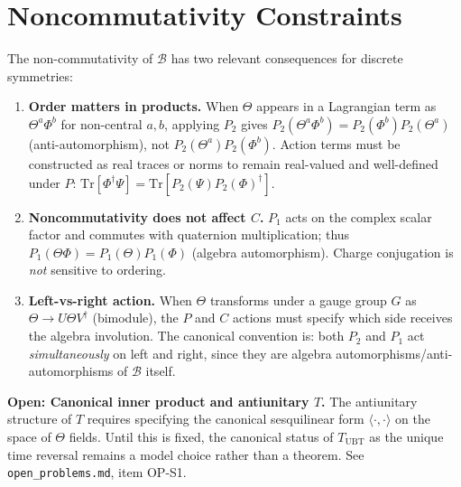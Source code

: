 \documentclass[12pt,a4paper]{article}
\theoremstyle{definition}
\theoremstyle{remark}
\begin{document}
\section{Noncommutativity Constraints}
\label{sec:ds:noncomm}

The non-commutativity of $\mathcal{B}$ has two relevant consequences for
discrete symmetries:

\begin{enumerate}
  \item \textbf{Order matters in products.}
    When $\Theta$ appears in a Lagrangian term as $\Theta^a \Phi^b$ for
    non-central $a,b$, applying $P_2$ gives
    $P_2(\Theta^a\Phi^b) = P_2(\Phi^b)P_2(\Theta^a)$
    (anti-automorphism), not $P_2(\Theta^a)P_2(\Phi^b)$.
    Action terms must be constructed as real traces or norms to remain
    real-valued and well-defined under $P$:
    $\mathrm{Tr}[\Phi^\dagger\Psi] = \mathrm{Tr}[P_2(\Psi)P_2(\Phi)^\dagger]$.

  \item \textbf{Noncommutativity does not affect $C$.}
    $P_1$ acts on the complex scalar factor and commutes with quaternion
    multiplication; thus $P_1(\Theta\Phi)=P_1(\Theta)P_1(\Phi)$
    (algebra automorphism).  Charge conjugation is \emph{not} sensitive
    to ordering.

  \item \textbf{Left-vs-right action.}
    When $\Theta$ transforms under a gauge group $G$ as
    $\Theta \to U\Theta V^\dagger$ (bimodule), the $P$ and $C$ actions
    must specify which side receives the algebra involution.
    The canonical convention is: both $P_2$ and $P_1$ act \emph{simultaneously}
    on left and right, since they are algebra automorphisms/anti-automorphisms
    of $\mathcal{B}$ itself.
\end{enumerate}

\begin{gapbox}
\textbf{Open: Canonical inner product and antiunitary $T$.}
The antiunitary structure of $T$ requires specifying the canonical
sesquilinear form $\langle\cdot,\cdot\rangle$ on the space of $\Theta$ fields.
Until this is fixed, the canonical status of $T_{\mathrm{UBT}}$ as the unique
time reversal remains a model choice rather than a theorem.
See \texttt{open\_problems.md}, item OP-S1.
\end{gapbox}

\ifdefined\INCLUDEMODE
\else
  
\end{document}
